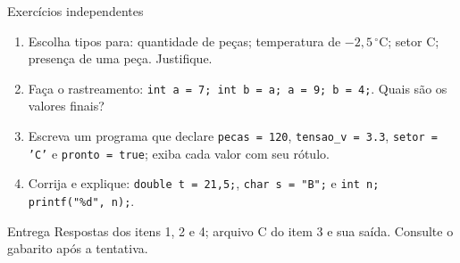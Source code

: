 \begin{frame}{Exercícios independentes}
\small
\begin{enumerate}
\item Escolha tipos para: quantidade de peças; temperatura de $-2{,}5\,^\circ$C; setor C; presença de uma peça. Justifique.
\item Faça o rastreamento: \texttt{int a = 7; int b = a; a = 9; b = 4;}. Quais são os valores finais?
\item Escreva um programa que declare \texttt{pecas = 120}, \texttt{tensao\_v = 3.3}, \texttt{setor = 'C'} e \texttt{pronto = true}; exiba cada valor com seu rótulo.
\item Corrija e explique: \texttt{double t = 21,5;}, \texttt{char s = "B";} e \texttt{int n; printf("\%d", n);}.
\end{enumerate}
\begin{block}{Entrega}
Respostas dos itens 1, 2 e 4; arquivo C do item 3 e sua saída. Consulte o gabarito após a tentativa.
\end{block}
\end{frame}
